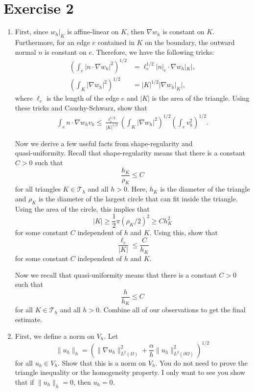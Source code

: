 \documentclass{article}
\theoremstyle{plain}
\theoremstyle{definition}
\theoremstyle{remark}
\begin{document}
\section*{Exercise 2}
\begin{enumerate}
  \item First, since $w_h|_K$ is affine-linear on $K$, then $\nabla w_h$ is constant on $K$.
        Furthermore, for an edge $e$ contained in $K$ on the boundary, the outward normal $n$ is constant on $e$.
        Therefore, we have the following tricks:
        \begin{align*}
          \left(\int_e|n \cdot \nabla w_h|^2\right)^{1/2} & = \ell_e^{1/2}|n|_e \cdot \nabla w_h|_K|, \\
          \left(\int_K |\nabla w_h|^2\right)^{1/2}        & = |K|^{1/2}|\nabla w_h|_K|,
        \end{align*}
        where $\ell_e$ is the length of the edge $e$ and $|K|$ is the area of the triangle.
        Using these tricks and Cauchy-Schwarz, show that
        \begin{align*}
          \int_e n \cdot \nabla w_h v_h \leq \frac{\ell_e^{1/2}}{|K|^{1/2}}\left(\int_K|\nabla w_h|^2\right)^{1/2}\left(\int_ev_h^2\right)^{1/2}.
        \end{align*}

        Now we derive a few useful facts from shape-regularity and \\quasi-uniformity.
        Recall that shape-regularity means that there is a constant $C > 0$ such that \[\frac{h_K}{\rho_K} \leq C\] for all triangles $K \in \mathcal T_h$ and all $h > 0$.
        Here, $h_K$ is the diameter of the triangle and $\rho_K$ is the diameter of the largest circle that can fit inside the triangle.
        Using the area of the circle, this implies that \[|K| \geq \frac{1}{2}\pi(\rho_K/2)^2 \geq Ch_K^2\] for some constant $C$ independent of $h$ and $K$.
        Using this, show that \[\frac{\ell_e}{|K|} \leq \frac{C}{h_K}\] for some constant $C$ independent of $h$ and $K$.

        Now we recall that quasi-uniformity means that there is a constant $C > 0$ such that \[\frac{h}{h_K} \leq C\] for all $K \in \mathcal T_h$ and all $h > 0$.
        Combine all of our observations to get the final estimate.

  \item First, we define a norm on $V_h$.
        Let \[\|u_h\|_h = \left(\|\nabla u_h\|_{L^2(\Omega)}^2 + \frac{\alpha}{h}\|u_h\|_{L^2(\partial\Omega)}^2\right)^{1/2}\]
        for all $u_h \in V_h$.
        Show that this is a norm on $V_h$.
        You do not need to prove the triangle inequality or the homogeneity property.
        I only want to see you show that if $\|u_h\|_h = 0$, then $u_h = 0$.


\end{enumerate}
\end{document}
